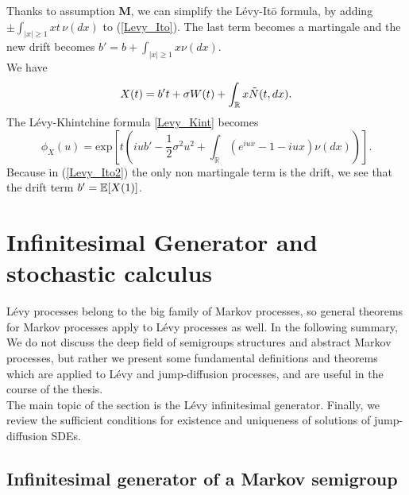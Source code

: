 \vspace{1.5em}

Thanks to assumption \textbf{M}, we can simplify the Lévy-It\={o} formula, by adding $\pm \int_{|x| \geq 1} x t\, \nu(dx)$ 
to (\ref{Levy_Ito}). The last term becomes a martingale and the new drift becomes $b' = b+\int_{|x| \geq 1} x \nu(dx)$.\\
We have 
\begin{equation}\label{Levy_Ito2}
 X(t) = b't + \sigma W(t) + \int_{\mathbb{R}} x \tilde{N}(t,dx).
\end{equation}
The Lévy-Khintchine formula \ref{Levy_Kint} becomes
\begin{equation}\label{Levy_Kint2}
\phi_X(u) = \mbox{exp} \left[ t \left( iub' - \frac{1}{2}\sigma^2 u^2 + \int_{\mathbb{R}} 
	   ( e^{iux} -1 -iux ) \nu(dx) \right) \right]. 
\end{equation}
Because in (\ref{Levy_Ito2}) the only non martingale term is the drift, we see that the drift term $b' = \mathbb{E}[X(1)]$.


\section{Infinitesimal Generator and stochastic calculus}

Lévy processes belong to the big family of Markov processes, so general theorems for Markov processes apply to
Lévy processes as well.
In the following summary,
We do not discuss the deep field of semigroups structures and abstract Markov processes, but rather we present some fundamental definitions and 
theorems which are applied to Lévy and jump-diffusion processes, and are useful in the course of the thesis.\\
The main topic of the section is the Lévy infinitesimal generator. 
Finally, we review the sufficient conditions for existence and uniqueness of solutions of jump-diffusion SDEs. 


\subsection{Infinitesimal generator of a Markov semigroup}

